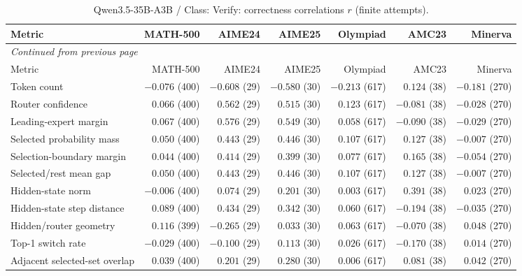 \begingroup\scriptsize\setlength{\tabcolsep}{4pt}
\begin{longtable}{@{}lrrrrrr@{}}
\caption{Qwen3.5-35B-A3B / Class: Verify: correctness correlations $r$ (finite attempts).}\label{tab:multi-qwen-class-Verify}\\
\toprule
Metric & MATH-500 & AIME24 & AIME25 & Olympiad & AMC23 & Minerva \\
\midrule\endfirsthead
\multicolumn{7}{l}{\textit{Continued from previous page}}\\
\toprule
Metric & MATH-500 & AIME24 & AIME25 & Olympiad & AMC23 & Minerva \\
\midrule\endhead
\bottomrule\endfoot
Token count & $-0.076$ (400) & $-0.608$ (29) & $-0.580$ (30) & $-0.213$ (617) & $0.124$ (38) & $-0.181$ (270) \\
Router confidence & $0.066$ (400) & $0.562$ (29) & $0.515$ (30) & $0.123$ (617) & $-0.081$ (38) & $-0.028$ (270) \\
Leading-expert margin & $0.067$ (400) & $0.576$ (29) & $0.549$ (30) & $0.058$ (617) & $-0.090$ (38) & $-0.029$ (270) \\
Selected probability mass & $0.050$ (400) & $0.443$ (29) & $0.446$ (30) & $0.107$ (617) & $0.127$ (38) & $-0.007$ (270) \\
Selection-boundary margin & $0.044$ (400) & $0.414$ (29) & $0.399$ (30) & $0.077$ (617) & $0.165$ (38) & $-0.054$ (270) \\
Selected/rest mean gap & $0.050$ (400) & $0.443$ (29) & $0.446$ (30) & $0.107$ (617) & $0.127$ (38) & $-0.007$ (270) \\
Hidden-state norm & $-0.006$ (400) & $0.074$ (29) & $0.201$ (30) & $0.003$ (617) & $0.391$ (38) & $0.023$ (270) \\
Hidden-state step distance & $0.089$ (400) & $0.434$ (29) & $0.342$ (30) & $0.060$ (617) & $-0.194$ (38) & $-0.035$ (270) \\
Hidden/router geometry & $0.116$ (399) & $-0.265$ (29) & $0.033$ (30) & $0.063$ (617) & $-0.070$ (38) & $0.048$ (270) \\
Top-1 switch rate & $-0.029$ (400) & $-0.100$ (29) & $0.113$ (30) & $0.026$ (617) & $-0.170$ (38) & $0.014$ (270) \\
Adjacent selected-set overlap & $0.039$ (400) & $0.201$ (29) & $0.280$ (30) & $0.006$ (617) & $0.081$ (38) & $0.042$ (270) \\
\end{longtable}\endgroup


